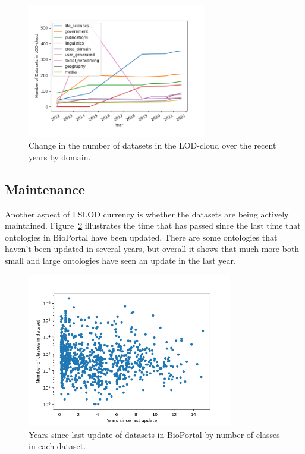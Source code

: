 \documentclass[runningheads]{llncs}
\begin{document}
    \begin{figure}[ht]
        \centering
        \includegraphics[width=0.7\textwidth]{figures/lod-cloud-change}
        \caption{Change in the number of datasets in the LOD-cloud over the recent years by domain.}
        \label{fig:lod-cloud-change}
    \end{figure}

    \subsection{Maintenance}
    Another aspect of LSLOD currency is whether the datasets are being actively maintained.
    Figure~\ref{fig:bioportal-maintenance} illustrates the time that has passed since the last time that ontologies in BioPortal have been updated.
    There are some ontologies that haven't been updated in several years, but overall it shows that much more both small and large ontologies have seen an update in the last year.

    \begin{figure}[ht]
        \centering
        \includegraphics[width=0.8\textwidth]{figures/bio-portal-maintenance}
        \caption{Years since last update of datasets in BioPortal by number of classes in each dataset.}
        \label{fig:bioportal-maintenance}
    \end{figure}
\end{document}
